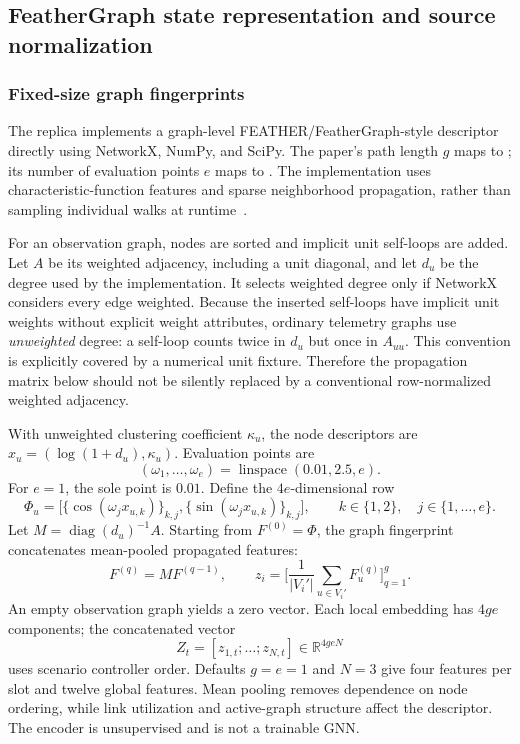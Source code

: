 \documentclass[11pt,a4paper]{article}
\newcommand{\code}[1]{\texttt{\detokenize{#1}}}
\newcommand{\R}{\mathbb{R}}
\begin{document}
\subsection{FeatherGraph state representation and source normalization}
\label{sec:embedding}

\subsubsection{Fixed-size graph fingerprints}

The replica implements a graph-level FEATHER/FeatherGraph-style descriptor
directly using NetworkX, NumPy, and SciPy. The paper's path length $g$ maps to
\code{embedding.order}; its number of evaluation points $e$ maps to
\code{embedding.eval_points}. The implementation uses characteristic-function
features and sparse neighborhood propagation, rather than sampling individual
walks at runtime~\cite{paper,code-embedding}.

For an observation graph, nodes are sorted and implicit unit self-loops are
added. Let $A$ be its weighted adjacency, including a unit diagonal, and let
$d_u$ be the degree used by the implementation. It selects weighted degree
only if NetworkX considers every edge weighted. Because the inserted self-loops
have implicit unit weights without explicit weight attributes, ordinary
telemetry graphs use \emph{unweighted} degree: a self-loop counts twice in
$d_u$ but once in $A_{uu}$. This convention is explicitly covered by a numerical
unit fixture. Therefore the propagation matrix below should not be silently
replaced by a conventional row-normalized weighted adjacency.

With unweighted clustering coefficient $\kappa_u$, the node descriptors are
$x_u=(\log(1+d_u),\kappa_u)$. Evaluation points are
\begin{equation}
 (\omega_1,\ldots,\omega_e)=\operatorname{linspace}(0.01,2.5,e).
\end{equation}
For $e=1$, the sole point is $0.01$. Define the $4e$-dimensional row
\begin{equation}
 \Phi_u=\bigl[\{\cos(\omega_jx_{u,k})\}_{k,j},
                   \{\sin(\omega_jx_{u,k})\}_{k,j}\bigr],
 \qquad k\in\{1,2\},\quad j\in\{1,\ldots,e\}.
\end{equation}
Let $M=\operatorname{diag}(d_u)^{-1}A$. Starting from $F^{(0)}=\Phi$,
the graph fingerprint concatenates mean-pooled propagated features:
\begin{equation}
 F^{(q)}=MF^{(q-1)},\qquad
 z_i=\biggl[\frac{1}{|V_i'|}\sum_{u\in V_i'}F^{(q)}_u
                                      \biggr]_{q=1}^{g}.
 \label{eq:feather}
\end{equation}
An empty observation graph yields a zero vector. Each local embedding has
$4ge$ components; the concatenated vector
\begin{equation}
 Z_t=[z_{1,t};\ldots;z_{N,t}]\in\R^{4geN}
\end{equation}
uses scenario controller order. Defaults $g=e=1$ and $N=3$ give four features
per slot and twelve global features. Mean pooling removes dependence on node
ordering, while link utilization and active-graph structure affect the
descriptor. The encoder is unsupervised and is not a trainable GNN.
\end{document}
